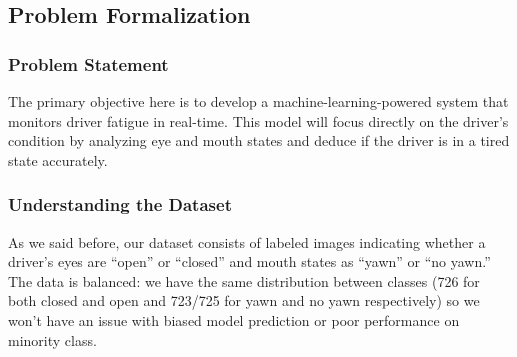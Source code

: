 \documentclass{modeleRapport}
\begin{document}
\subsection{Problem Formalization}
\subsubsection{Problem Statement}
The primary objective here is to develop a machine-learning-powered system that monitors driver fatigue in real-time. This model will focus directly on the driver’s condition by analyzing eye and mouth states and deduce if the driver is in a tired state accurately.
\subsubsection{Understanding the Dataset}
As we said before, our dataset consists of labeled images indicating whether a driver’s eyes are “open” or “closed” and mouth states as “yawn” or “no yawn.” The data is balanced: we have the same distribution between classes (726 for both closed and open and 723/725 for yawn and no yawn respectively) so we won’t have an issue with biased model prediction or poor performance on minority class. \\
\end{document}
